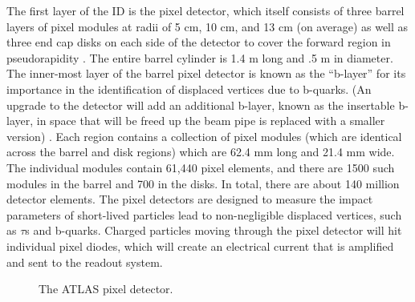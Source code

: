 The first layer of the ID is the pixel detector, which itself consists of three barrel layers of pixel modules at radii of 5 cm, 10 cm, and 13 cm (on average) as well as three end cap disks on each side of the detector to cover the forward region in pseudorapidity \cite{PIXEL_DETECTOR}.
The entire barrel cylinder is 1.4 m long and .5 m in diameter.
The inner-most layer of the barrel pixel detector is known as the ``b-layer'' for its importance in the identification of displaced vertices due to b-quarks.
(An upgrade to the detector will add an additional b-layer, known as the insertable b-layer, in space that will be freed up the beam pipe is replaced with a smaller version) \cite{INSERTABLE_B_LAYER}.
Each region contains a collection of pixel modules (which are identical across the barrel and disk regions) which are 62.4 mm long and 21.4 mm wide.
The individual modules contain 61,440 pixel elements, and there are 1500 such modules in the barrel and 700 in the disks. %
In total, there are about 140 million detector elements. %
The pixel detectors are designed to measure the impact parameters of short-lived particles lead to non-negligible displaced vertices, such as $\tau$s and b-quarks.
Charged particles moving through the pixel detector will hit individual pixel diodes, which will create an electrical current that is amplified and sent to the readout system.


\begin{figure}
  \begin{center}
  \end{center}
  \caption{The ATLAS pixel detector.}
  \label{img:PixelDetector}
\end{figure}




